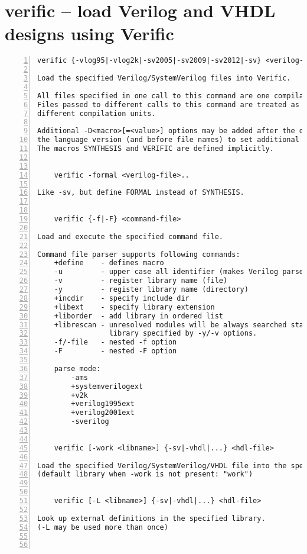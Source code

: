 \section{verific -- load Verilog and VHDL designs using Verific}
\label{cmd:verific}
\begin{lstlisting}[numbers=left,frame=single]
    verific {-vlog95|-vlog2k|-sv2005|-sv2009|-sv2012|-sv} <verilog-file>..

Load the specified Verilog/SystemVerilog files into Verific.

All files specified in one call to this command are one compilation unit.
Files passed to different calls to this command are treated as belonging to
different compilation units.

Additional -D<macro>[=<value>] options may be added after the option indicating
the language version (and before file names) to set additional verilog defines.
The macros SYNTHESIS and VERIFIC are defined implicitly.


    verific -formal <verilog-file>..

Like -sv, but define FORMAL instead of SYNTHESIS.


    verific {-f|-F} <command-file>

Load and execute the specified command file.

Command file parser supports following commands:
    +define    - defines macro
    -u         - upper case all identifier (makes Verilog parser case insensitive)
    -v         - register library name (file)
    -y         - register library name (directory)
    +incdir    - specify include dir
    +libext    - specify library extension
    +liborder  - add library in ordered list
    +librescan - unresolved modules will be always searched starting with the first
                 library specified by -y/-v options.
    -f/-file   - nested -f option
    -F         - nested -F option

    parse mode:
        -ams
        +systemverilogext
        +v2k
        +verilog1995ext
        +verilog2001ext
        -sverilog


    verific [-work <libname>] {-sv|-vhdl|...} <hdl-file>

Load the specified Verilog/SystemVerilog/VHDL file into the specified library.
(default library when -work is not present: "work")


    verific [-L <libname>] {-sv|-vhdl|...} <hdl-file>

Look up external definitions in the specified library.
(-L may be used more than once)



\end{lstlisting}
